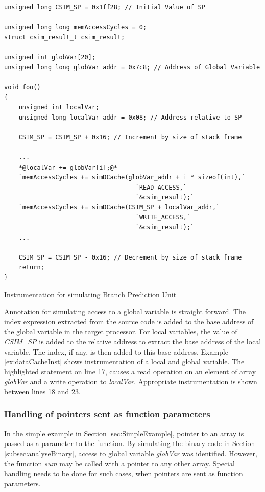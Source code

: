 \vspace*{10pt}
\begin{Example}[h]
\begin{lstlisting}
unsigned long CSIM_SP = 0x1ff28; // Initial Value of SP

unsigned long long memAccessCycles = 0;
struct csim_result_t csim_result;

unsigned int globVar[20];
unsigned long long globVar_addr = 0x7c8; // Address of Global Variable

void foo()
{
    unsigned int localVar;
    unsigned long localVar_addr = 0x08; // Address relative to SP
    
    CSIM_SP = CSIM_SP + 0x16; // Increment by size of stack frame
    
    ...
    *@localVar += globVar[i];@*
    `memAccessCycles += simDCache(globVar_addr + i * sizeof(int),`
                                    `READ_ACCESS,`
                                    `&csim_result);`
    `memAccessCycles += simDCache(CSIM_SP + localVar_addr,`
                                    `WRITE_ACCESS,`
                                    `&csim_result);`
    ...
    
    CSIM_SP = CSIM_SP - 0x16; // Decrement by size of stack frame
    return;    
}        
\end{lstlisting}
\caption{Instrumentation for simulating Branch Prediction Unit}
\label{ex:dataCacheInst}
\end{Example}

Annotation for simulating access to a global variable is straight forward. The index expression extracted from the source code is added to the base address of the global variable in the target processor. For local variables, the value of \emph{CSIM\_SP} is added to the relative address to extract the base address of the local variable. The index, if any, is then added to this base address. Example \ref{ex:dataCacheInst} shows instrumentation of a local and global variable. The highlighted statement on line 17, causes a read operation on an element of array \emph{globVar} and a write operation to \emph{localVar}. Appropriate instrumentation is shown between lines 18 and 23.

\subsubsection{Handling of pointers sent as function parameters}

In the simple example in Section \ref{sec:SimpleExample}, pointer to an array is passed as a parameter to the function. By simulating the binary code in Section \ref{subsec:analyseBinary}, access to global variable \emph{globVar} was identified. However, the function \emph{sum} may be called with a pointer to any other array. Special handling needs to be done for such cases, when pointers are sent as function parameters.

